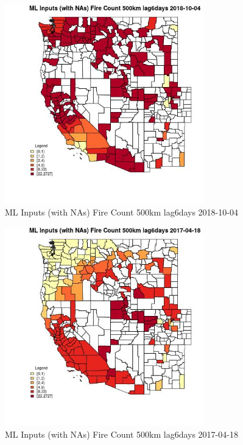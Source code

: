 \begin{figure} 
\centering  
\includegraphics[width=0.77\textwidth]{Code_Outputs/Report_ML_input_PM25_Step4_part_f_de_duplicated_aveswNAs_CountyFire_Count_500km_lag6daysMean2018-10-04.jpg} 
\caption{\label{fig:Report_ML_input_PM25_Step4_part_f_de_duplicated_aveswNAsCountyFire_Count_500km_lag6daysMean2018-10-04}ML Inputs (with NAs) Fire Count 500km lag6days 2018-10-04} 
\end{figure} 
 

\begin{figure} 
\centering  
\includegraphics[width=0.77\textwidth]{Code_Outputs/Report_ML_input_PM25_Step4_part_f_de_duplicated_aveswNAs_CountyFire_Count_500km_lag6daysMean2017-04-18.jpg} 
\caption{\label{fig:Report_ML_input_PM25_Step4_part_f_de_duplicated_aveswNAsCountyFire_Count_500km_lag6daysMean2017-04-18}ML Inputs (with NAs) Fire Count 500km lag6days 2017-04-18} 
\end{figure} 
 

